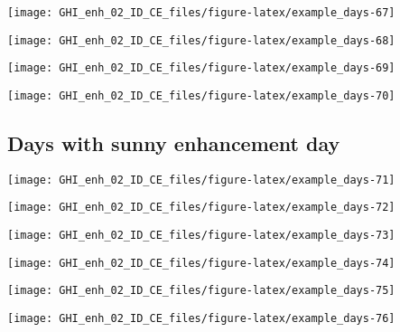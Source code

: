 \documentclass[
  10pt,
  a4paper,oneside]{article}
\begin{document}
\begin{center}\texttt{[image: GHI\_enh\_02\_ID\_CE\_files/figure-latex/example\_days-67]} \end{center}

\begin{center}\texttt{[image: GHI\_enh\_02\_ID\_CE\_files/figure-latex/example\_days-68]} \end{center}

\begin{center}\texttt{[image: GHI\_enh\_02\_ID\_CE\_files/figure-latex/example\_days-69]} \end{center}

\begin{center}\texttt{[image: GHI\_enh\_02\_ID\_CE\_files/figure-latex/example\_days-70]} \end{center}

\FloatBarrier

\hypertarget{days-with-sunny-enhancement-day}{%
\subsection{Days with sunny enhancement day}\label{days-with-sunny-enhancement-day}}

\begin{center}\texttt{[image: GHI\_enh\_02\_ID\_CE\_files/figure-latex/example\_days-71]} \end{center}

\begin{center}\texttt{[image: GHI\_enh\_02\_ID\_CE\_files/figure-latex/example\_days-72]} \end{center}

\begin{center}\texttt{[image: GHI\_enh\_02\_ID\_CE\_files/figure-latex/example\_days-73]} \end{center}

\begin{center}\texttt{[image: GHI\_enh\_02\_ID\_CE\_files/figure-latex/example\_days-74]} \end{center}

\begin{center}\texttt{[image: GHI\_enh\_02\_ID\_CE\_files/figure-latex/example\_days-75]} \end{center}

\begin{center}\texttt{[image: GHI\_enh\_02\_ID\_CE\_files/figure-latex/example\_days-76]} \end{center}
\end{document}
